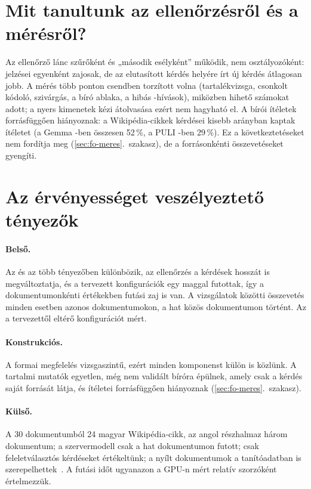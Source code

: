 \section{Mit tanultunk az ellenőrzésről és a mérésről?}
\label{sec:meres-tanulsag}

Az ellenőrző lánc szűrőként és „második esélyként” működik, nem osztályozóként: jelzései egyenként
zajosak, de az elutasított kérdés helyére írt új kérdés átlagosan jobb. A mérés több ponton csendben
torzított volna (tartalékvizsga, csonkolt kódoló, szivárgás, a bíró ablaka, a hibás -hívások), miközben
hihető számokat adott; a nyers kimenetek kézi átolvasása ezért nem hagyható el. A bírói ítéletek
forrásfüggően hiányoznak: a Wikipédia-cikkek kérdései kisebb arányban kaptak ítéletet (a Gemma -ben
összesen 52\,\%, a PULI -ben 29\,\%). Ez a következtetéseket nem fordítja meg (\ref{sec:fo-meres}.~szakasz),
de a forrásonkénti összevetéseket gyengíti.

\section{Az érvényességet veszélyeztető tényezők}
\label{sec:validitas}

\paragraph{Belső.} Az  és az  több tényezőben különbözik, az ellenőrzés a kérdések hosszát is
megváltoztatja, és a tervezett konfigurációk egy maggal futottak, így a dokumentumonkénti értékekben futási
zaj is van. A vizsgálatok közötti összevetés minden esetben azonos dokumentumokon, a hat közös
dokumentumon történt. Az  a tervezettől eltérő konfigurációt mért.
\paragraph{Konstrukciós.} A formai megfelelés vizsgaszintű, ezért minden komponenst külön is közlünk. A
tartalmi mutatók egyetlen, még nem validált bíróra épülnek, amely csak a kérdés saját forrását látja, és
ítéletei forrásfüggően hiányoznak (\ref{sec:fo-meres}.~szakasz).
\paragraph{Külső.} A 30 dokumentumból 24 magyar Wikipédia-cikk, az angol részhalmaz három dokumentum; a
szervermodell csak a hat dokumentumon futott; csak feleletválasztós kérdéseket értékeltünk; a nyílt
dokumentumok a tanítóadatban is szerepelhettek~\cite{sainz2023contamination}. A futási időt ugyanazon a GPU-n
mért relatív szorzóként értelmezzük.
